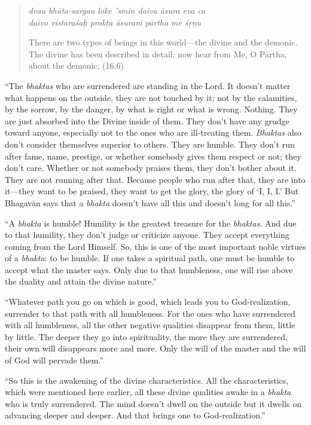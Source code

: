 \documentclass[12pt, twoside, openright]{memoir}
\begin{document}
\par
\begin{verse}
\textit{dvau bhūta-sargau loke ’smin daiva āsura eva ca} \\
\textit{daivo vistaraśaḥ prokta āsuraṁ pārtha me śṛṇu}

\noindent There are two types of beings in this world---the divine and the demonic. The divine has been described in detail; now hear from Me, O Pārtha, about the demonic. (16.6)
\end{verse}
\par


\enquote{The \textit{bhaktas} who are surrendered are standing in the Lord. It doesn’t matter what happens on the outside, they are not touched by it; not by the calamities, by the sorrow, by the danger, by what is right or what is wrong. Nothing. They are just absorbed into the Divine inside of them. They don’t have any grudge toward anyone, especially not to the ones who are ill-treating them. \textit{Bhaktas} also don’t consider themselves superior to others. They are humble. They don’t run after fame, name, prestige, or whether somebody gives them respect or not; they don’t care. Whether or not somebody praises them, they don’t bother about it. They are not running after that. Because people who run after that, they are into it---they want to be praised, they want to get the glory, the glory of \enquote{I, I, I.} But Bhagavān says that a \textit{bhakta} doesn’t have all this and doesn’t long for all this.}

\enquote{A \textit{bhakta} is humble! Humility is the greatest treasure for the \textit{bhaktas}. And due to that humility, they don’t judge or criticize anyone. They accept everything coming from the Lord Himself. So, this is one of the most important noble virtues of a \textit{bhakta}: to be humble. If one takes a spiritual path, one must be humble to accept what the master says. Only due to that humbleness, one will rise above the duality and attain the divine nature.}

\enquote{Whatever path you go on which is good, which leads you to God-realization, surrender to that path with all humbleness. For the ones who have surrendered with all humbleness, all the other negative qualities disappear from them, little by little. The deeper they go into spirituality, the more they are surrendered, their own will disappears more and more. Only the will of the master and the will of God will pervade them.}

\enquote{So this is the awakening of the divine characteristics. All the characteristics, which were mentioned here earlier, all these divine qualities awake in a \textit{bhakta} who is truly surrendered. The mind doesn’t dwell on the outside but it dwells on advancing deeper and deeper. And that brings one to God-realization.}
\end{document}
